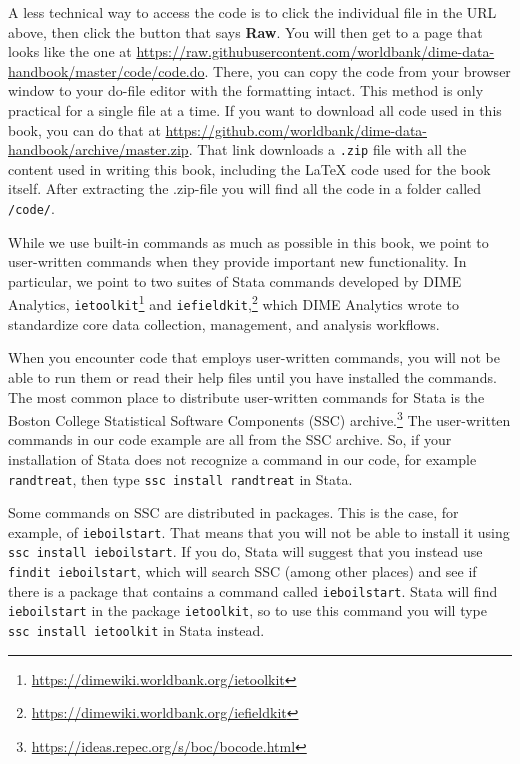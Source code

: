 \documentclass[
]{book}
\begin{document}
A less technical way to access the code
is to click the individual file in the URL above, then click
the button that says \textbf{Raw}.
You will then get to a page that looks like the one at
\url{https://raw.githubusercontent.com/worldbank/dime-data-handbook/master/code/code.do}.
There, you can copy the code
from your browser window to your do-file editor with the formatting intact.
This method is only practical for a single file at a time.
If you want to download all code used in this book, you can do that at
\url{https://github.com/worldbank/dime-data-handbook/archive/master.zip}.
That link downloads a \texttt{.zip} file
with all the content used in writing this book,
including the LaTeX code used for the book itself.
After extracting the .zip-file you will find all the code in a folder called \texttt{/code/}.

While we use built-in commands as much as possible in this book,
we point to user-written commands when they provide important new functionality.
In particular, we point to two suites of Stata commands developed by DIME Analytics,
\texttt{ietoolkit}\footnote{\url{https://dimewiki.worldbank.org/ietoolkit}}
and \texttt{iefieldkit},\footnote{\url{https://dimewiki.worldbank.org/iefieldkit}}
which DIME Analytics wrote to standardize
core data collection, management, and analysis workflows.

When you encounter code that employs user-written commands,
you will not be able to run them or read their help files
until you have installed the commands.
The most common place to distribute user-written commands for Stata
is the Boston College Statistical Software Components (SSC) archive.\footnote{\url{https://ideas.repec.org/s/boc/bocode.html}}
The user-written commands in our code example are all from the SSC archive.
So, if your installation of Stata does not recognize a command in our code, for example
\texttt{randtreat}, then type \texttt{ssc\ install\ randtreat} in Stata.

Some commands on SSC are distributed in packages.
This is the case, for example, of \texttt{ieboilstart}.
That means that you will not be able to install it using \texttt{ssc\ install\ ieboilstart}.
If you do, Stata will suggest that you instead use \texttt{findit\ ieboilstart},
which will search SSC (among other places) and see if there is a
package that contains a command called \texttt{ieboilstart}.
Stata will find \texttt{ieboilstart} in the package \texttt{ietoolkit},
so to use this command you will type \texttt{ssc\ install\ ietoolkit} in Stata instead.
\end{document}
